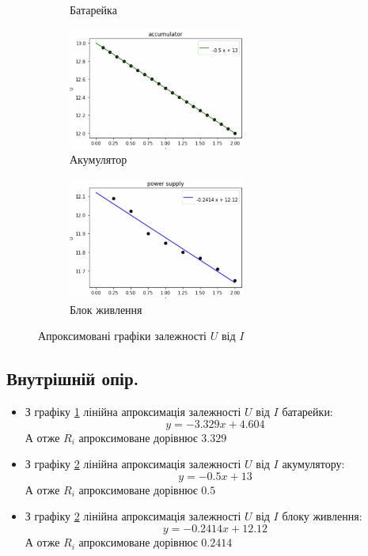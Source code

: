\documentclass[a4paper,12pt]{article}
\begin{document}
\begin{justify}
\begin{figure}[!h]
\begin{subfigure}{0.4\linewidth}
    		\caption{Батарейка}
			\label{fig:6a}
    	\end{subfigure}\hfill
    	\begin{subfigure}{0.4\linewidth}
			\includegraphics[height=40mm]{media/graph6b.png}
    		\caption{Акумулятор}
			\label{fig:6b}
    	\end{subfigure}\hfill
    	\begin{subfigure}{0.4\linewidth}
			\includegraphics[height=40mm]{media/graph6c.png}
    		\caption{Блок живлення}
			\label{fig:6c}
    	\end{subfigure}\hfill
		\caption{Апроксимовані графіки залежності $U$ від $I$}
		\label{fig:6}
	\end{figure}
	\subsection{Внутрішній опір.}
	\begin{itemize}
		\item З графіку \ref{fig:6a} лінійна апроксимація залежності $U$ від $I$ батарейки: $$y=-3.329 x + 4.604$$ А отже $R_i$ апроксимоване дорівнює $3.329$
		\item З графіку \ref{fig:6b} лінійна апроксимація залежності $U$ від $I$ акумулятору: $$y=-0.5 x + 13$$  А отже $R_i$ апроксимоване дорівнює $0.5$
		\item З графіку \ref{fig:6b} лінійна апроксимація залежності $U$ від $I$ блоку живлення: $$y=-0.2414 x + 12.12$$ А отже $R_i$ апроксимоване дорівнює $0.2414$
	\end{itemize}

\end{justify}
\end{document}
